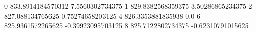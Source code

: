 0 833.8914184570312 7.5560302734375
1 829.8382568359375 3.50286865234375
2 827.088134765625 0.75274658203125
4 826.3353881835938 0.0
6 825.9361572265625 -0.39923095703125
8 825.7122802734375 -0.62310791015625
